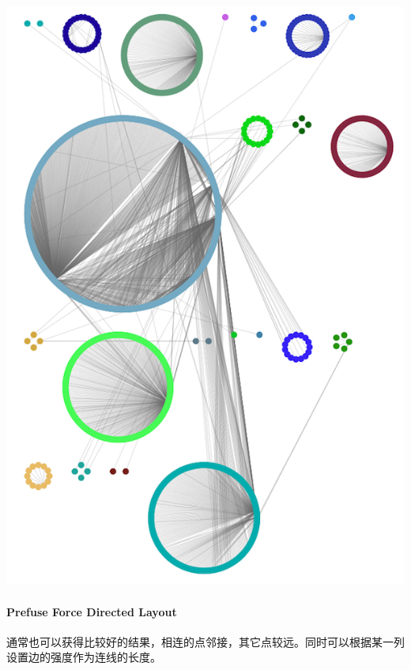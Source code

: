 \documentclass[]{article}
\numberwithin{figure}{section}
\numberwithin{table}{section}
\theoremstyle{definition}
\theoremstyle{definition}
\theoremstyle{definition}
\theoremstyle{remark}
\begin{document}
\begin{center}\includegraphics[width=0.95\linewidth,height=0.7\textheight,keepaspectratio]{images/group_by_attributes_layout} \end{center}

\paragraph{Prefuse Force Directed
Layout}\label{prefuse-force-directed-layout}

通常也可以获得比较好的结果，相连的点邻接，其它点较远。同时可以根据某一列设置边的强度作为连线的长度。
\end{document}
